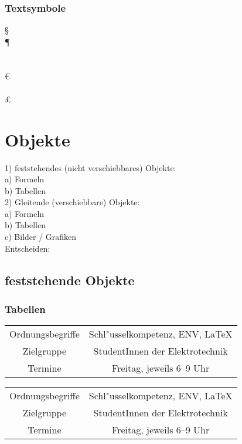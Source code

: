\documentclass[a4paper,12pt,titlepage]{article} %
\begin{document}
\subsubsection{Textsymbole}
\S \\
\P \\
\texteuro \\
\officialeuro \\
\euro \\
\textyen \\
\pounds \\

\newpage
\section{Objekte}
1) feststehendes (nicht verschiebbares) Objekte: \\
  a) Formeln \\
  b) Tabellen \\
2) Gleitende (verschiebbare) Objekte: \\
  a) Formeln \\
  b) Tabellen \\
  c) Bilder / Grafiken \\
  
Entscheiden:

\subsection{feststehende Objekte}
\subsubsection{Tabellen}
\begin{tabular}{cc} %
 Ordnungsbegriffe &
 Schl"usselkompetenz, ENV, \LaTeX \\
 Zielgruppe &
 StudentInnen der Elektrotechnik \\
 Termine & Freitag, jeweils 6--9 Uhr \\
\end{tabular}

\begin{tabular}{|c|c|} %
 Ordnungsbegriffe &
 Schl"usselkompetenz, ENV, \LaTeX \\
 Zielgruppe &
 StudentInnen der Elektrotechnik \\
 Termine & Freitag, jeweils 6--9 Uhr \\
\end{tabular}
\end{document}
